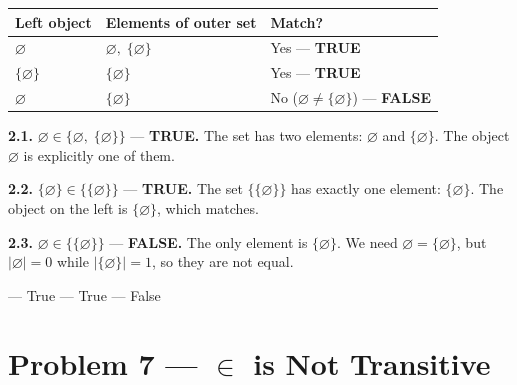 \documentclass[12pt, a4paper]{article}
\begin{document}
\begin{center}
\renewcommand{\arraystretch}{1.4}
\begin{tabular}{lll}
\toprule
\textbf{Left object} & \textbf{Elements of outer set} & \textbf{Match?} \\
\midrule
$\varnothing$ & $\varnothing,\;\{\varnothing\}$ & Yes --- \textbf{TRUE} \\
$\{\varnothing\}$ & $\{\varnothing\}$ & Yes --- \textbf{TRUE} \\
$\varnothing$ & $\{\varnothing\}$ & No ($\varnothing \neq \{\varnothing\}$) --- \textbf{FALSE} \\
\bottomrule
\end{tabular}
\end{center}

\textbf{2.1.}\; $\varnothing \in \{\varnothing,\;\{\varnothing\}\}$
\;---\; \textbf{TRUE.}
The set has two elements: $\varnothing$ and $\{\varnothing\}$.
The object $\varnothing$ is explicitly one of them.

\textbf{2.2.}\; $\{\varnothing\} \in \{\{\varnothing\}\}$
\;---\; \textbf{TRUE.}
The set $\{\{\varnothing\}\}$ has exactly one element: $\{\varnothing\}$.
The object on the left is $\{\varnothing\}$, which matches.

\textbf{2.3.}\; $\varnothing \in \{\{\varnothing\}\}$
\;---\; \textbf{FALSE.}
The only element is $\{\varnothing\}$.
We need $\varnothing = \{\varnothing\}$, but $|\varnothing|=0$ while $|\{\varnothing\}|=1$,
so they are not equal.

\begin{answerbox}
 --- True  --- True  --- False
\end{answerbox}

\section{Problem 7 --- $\in$ is Not Transitive}
\end{document}
